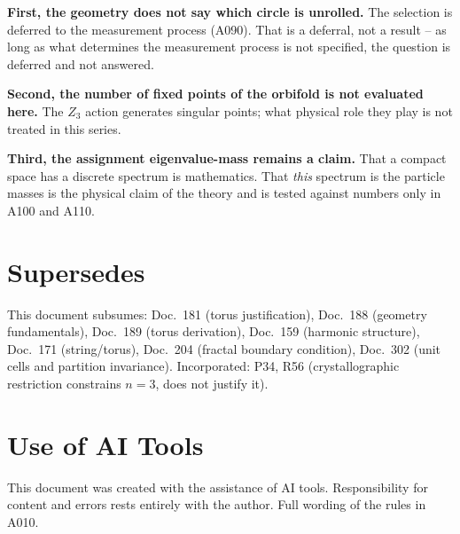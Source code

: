 \textbf{First, the geometry does not say which circle is unrolled.} The
selection is deferred to the measurement process (A090). That is a deferral,
not a result -- as long as what determines the measurement process is not
specified, the question is deferred and not answered.

\textbf{Second, the number of fixed points of the orbifold is not evaluated
here.} The $Z_3$ action generates singular points; what physical role they
play is not treated in this series.

\textbf{Third, the assignment eigenvalue-mass remains a claim.} That a compact
space has a discrete spectrum is mathematics. That \emph{this} spectrum is the
particle masses is the physical claim of the theory and is tested against
numbers only in A100 and A110.

\section{Supersedes}

This document subsumes: Doc.~181 (torus justification), Doc.~188 (geometry
fundamentals), Doc.~189 (torus derivation), Doc.~159 (harmonic structure),
Doc.~171 (string/torus), Doc.~204 (fractal boundary condition), Doc.~302
(unit cells and partition invariance). Incorporated: P34, R56 (crystallographic
restriction constrains $n=3$, does not justify it).

\section{Use of AI Tools}

This document was created with the assistance of AI tools.
Responsibility for content and errors rests entirely with the author.
Full wording of the rules in A010.
